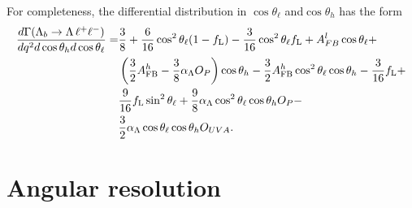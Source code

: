For completeness, the differential distribution in $\cos\theta_\ell$ and$\cos\theta_h$ has the form
\begin{align}
\frac{d\Gamma(\Lambda_{b}\rightarrow \Lambda \,\ell^{+}\ell^{-})}{dq^2d\cos\theta_h d\cos\theta_\ell}=&
\frac{3}{8}+\frac{6}{16}\cos^2\theta_\ell(1-f_{\rm L})-\frac{3}{16}\cos^2\theta_\ell f_{\rm L}
+A_{FB}^l\cos\theta_\ell+ \nonumber \\
& \left(\frac{3}{2}A_{\rm FB}^h-\frac{3}{8}\alpha_\Lambda O_P\right)\cos\theta_h
-\frac{3}{2}A_{\rm FB}^h\cos^2\theta_\ell\cos\theta_h-\frac{3}{16}f_{\rm L}+ \nonumber \\
& \frac{9}{16}f_{\rm L}\sin^2\theta_\ell+\frac{9}{8}\alpha_\Lambda \cos^2\theta_\ell\cos\theta_h O_P- \nonumber \\
& \frac{3}{2}\alpha_\Lambda \cos\theta_\ell\cos\theta_h O_{UVA}.
\label{eq:2DcosThetaLandB}
\end{align}


\section{Angular resolution}
\label{sec:and_resolution}

